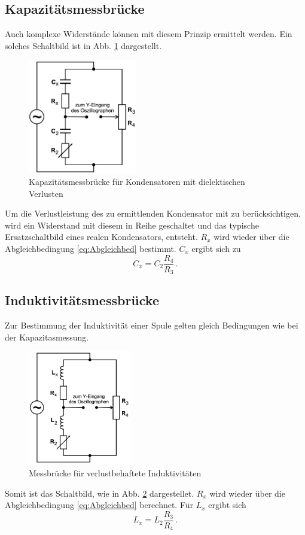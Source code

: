     \subsection{Kapazitätsmessbrücke}
    Auch komplexe Widerstände können mit diesem Prinzip ermittelt werden.
    Ein solches Schaltbild ist in Abb. \ref{fig:Kapatitaetsmessbruecke} dargestellt.
    \begin{figure}
        \centering
        \includegraphics[height= 5cm]{Messdaten/Kapazitaetsmessung.jpg}
        \caption{Kapazitätsmessbrücke für Kondensatoren mit dielektischen Verlusten}
        \label{fig:Kapatitaetsmessbruecke}
    \end{figure}
    Um die Verlustleistung des zu ermittlenden Kondensator mit zu berücksichtigen, wird ein Widerstand mit diesem in Reihe geschaltet
    und das typische Ersatzschaltbild eines realen Kondensators, entsteht.
    $R_x$ wird wieder über die Abgleichbedingung \eqref{eq:Abgleichbed} bestimmt.
    $C_x$ ergibt sich zu
    \begin{equation}
         C_x = C_2 \frac{R_4}{R_3} \, \text{.}
         \label{eq:kapawiderstand}
    \end{equation}
    \subsection{Induktivitätsmessbrücke}
    Zur Bestimmung der Induktivität einer Spule gelten gleich Bedingungen wie bei der Kapazitasmessung.
    \begin{figure}
        \centering
        \includegraphics[height=5cm]{Induktivitaetsmessung.jpg}
        \caption{Messbrücke für verlustbehaftete Induktivitäten}
        \label{fig:Induktivitaetsmessbruecke}
    \end{figure}
    Somit ist das Schaltbild, wie in Abb. \ref{fig:Induktivitaetsmessbruecke} dargestellet.
    $R_x$ wird wieder über die Abgleichbedingung \eqref{eq:Abgleichbed} berechnet.
    Für $L_x$ ergibt sich
    \begin{equation}
        L_x = L_2 \frac{R_3}{R_4}\, \text{.}
        \label{eq:induktivität}
    \end{equation}
